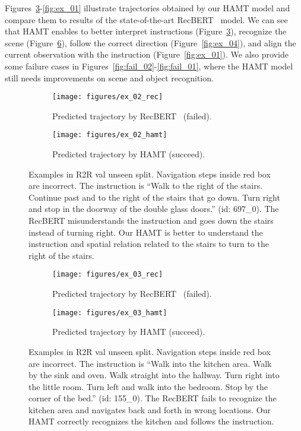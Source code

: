 Figures~\ref{fig:ex_02}-\ref{fig:ex_01} illustrate trajectories obtained by our HAMT model and compare them to results of the state-of-the-art RecBERT~\cite{hong2020recurrent} model.
We can see that HAMT enables to better interpret instructions (Figure~\ref{fig:ex_02}), recognize the scene (Figure~\ref{fig:ex_03}), follow the correct direction (Figure~\ref{fig:ex_04}), and align the current observation with the instruction (Figure~\ref{fig:ex_01}). We also provide some failure cases in Figures~\ref{fig:fail_02}-\ref{fig:fail_01}, where the HAMT model still needs improvements on scene and object recognition.

\begin{figure}
	\centering
	\begin{subfigure}[b]{0.48\textwidth}
		\centering
		\texttt{[image: figures/ex\_02\_rec]}
		\caption{Predicted trajectory by RecBERT~\cite{hong2020recurrent} (failed).}
		\label{fig:ex_02_rec}
	\end{subfigure}
	\hfill
	\begin{subfigure}[b]{0.48\textwidth}
		\centering
		\texttt{[image: figures/ex\_02\_hamt]}
		\caption{Predicted trajectory by HAMT (succeed).}
		\label{fig:ex_02_hamt}
	\end{subfigure}
	\caption{Examples in R2R val unseen split. Navigation steps inside red box are incorrect. The instruction is ``Walk to the right of the stairs. Continue past and to the right of the stairs that go down. Turn right and stop in the doorway of the double glass doors.'' (id: 697\_0). The RecBERT misunderstands the instruction and goes down the stairs instead of turning right. Our HAMT is better to understand the instruction and spatial relation related to the stairs to turn to the right of the stairs.}
	\label{fig:ex_02}
\end{figure}

\begin{figure}
	\centering
	\begin{subfigure}[b]{0.48\textwidth}
		\centering
		\texttt{[image: figures/ex\_03\_rec]}
		\caption{Predicted trajectory by RecBERT~\cite{hong2020recurrent} (failed).}
		\label{fig:ex_03_rec}
	\end{subfigure}
	\hfill
	\begin{subfigure}[b]{0.48\textwidth}
		\centering
		\texttt{[image: figures/ex\_03\_hamt]}
		\caption{Predicted trajectory by HAMT (succeed).}
		\label{fig:ex_03_hamt}
	\end{subfigure}
	\caption{Examples in R2R val unseen split. Navigation steps inside red box are incorrect. The instruction is ``Walk into the kitchen area. Walk by the sink and oven. Walk straight into the hallway. Turn right into the little room. Turn left and walk into the bedroom. Stop by the corner of the bed.'' (id: 155\_0). The RecBERT fails to recognize the kitchen area and navigates back and forth in wrong locations. Our HAMT correctly recognizes the kitchen and follows the instruction.}
	\label{fig:ex_03}
\end{figure}

